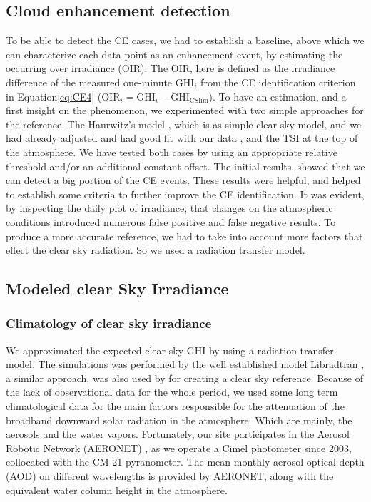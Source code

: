 \documentclass[preprint, 3p,
authoryear]{elsarticle} %
\begin{document}
\hypertarget{cloud-enhancement-detection}{%
\subsection{Cloud enhancement
detection}\label{cloud-enhancement-detection}}

To be able to detect the CE cases, we had to establish a baseline, above
which we can characterize each data point as an enhancement event, by
estimating the occurring over irradiance (OIR). The OIR, here is defined
as the irradiance difference of the measured one-minute \(\text{GHI}_i\)
from the CE identification criterion in
Equation\nobreakspace\ref{eq:CE4}
(\(\text{OIR}_i = \text{GHI}_i - \text{GHI}_\text{CSlim}\)). To have an
estimation, and a first insight on the phenomenon, we experimented with
two simple approaches for the reference. The Haurwitz's model
\citep{Haurwitz1945}, which is as simple clear sky model, and we had
already adjusted and had good fit with our data \citep{Natsis2023}, and
the TSI at the top of the atmosphere. We have tested both cases by using
an appropriate relative threshold and/or an additional constant offset.
The initial results, showed that we can detect a big portion of the CE
events. These results were helpful, and helped to establish some
criteria to further improve the CE identification. It was evident, by
inspecting the daily plot of irradiance, that changes on the atmospheric
conditions introduced numerous false positive and false negative
results. To produce a more accurate reference, we had to take into
account more factors that effect the clear sky radiation. So we used a
radiation transfer model.

\hypertarget{modeled-clear-sky-irradiance}{%
\subsection{Modeled clear Sky
Irradiance}\label{modeled-clear-sky-irradiance}}

\hypertarget{climatology-of-clear-sky-irradiance}{%
\subsubsection{Climatology of clear sky
irradiance}\label{climatology-of-clear-sky-irradiance}}

We approximated the expected clear sky GHI by using a radiation transfer
model. The simulations was performed by the well established model
Libradtran \citep{Emde2016}, a similar approach, was also used by
\citet{Vamvakas2020} for creating a clear sky reference. Because of the
lack of observational data for the whole period, we used some long term
climatological data for the main factors responsible for the attenuation
of the broadband downward solar radiation in the atmosphere. Which are
mainly, the aerosols and the water vapors. Fortunately, our site
participates in the Aerosol Robotic Network (AERONET)
\citep{Giles2019, Buis1998}, as we operate a Cimel photometer since
2003, collocated with the CM-21 pyranometer. The mean monthly aerosol
optical depth (AOD) on different wavelengths is provided by AERONET,
along with the equivalent water column height in the atmosphere.
\end{document}
